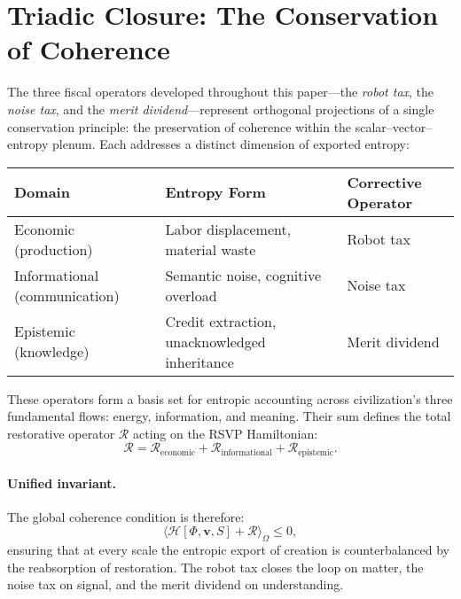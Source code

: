 \documentclass[12pt]{article}
\begin{document}
\section{Triadic Closure: The Conservation of Coherence}
\label{sec:triadic-closure}
The three fiscal operators developed throughout this paper—the \emph{robot tax}, the \emph{noise tax}, and the \emph{merit dividend}—represent orthogonal projections of a single conservation principle: the preservation of coherence within the scalar–vector–entropy plenum. Each addresses a distinct dimension of exported entropy:
\begin{center}
\begin{tabular}{@{}lll@{}}
\toprule
\textbf{Domain} & \textbf{Entropy Form} & \textbf{Corrective Operator} \\
\midrule
Economic (production) & Labor displacement, material waste & Robot tax \\
Informational (communication) & Semantic noise, cognitive overload & Noise tax \\
Epistemic (knowledge) & Credit extraction, unacknowledged inheritance & Merit dividend \\
\bottomrule
\end{tabular}
\end{center}

These operators form a basis set for entropic accounting across civilization’s three fundamental flows: energy, information, and meaning. Their sum defines the total restorative operator $\mathcal{R}$ acting on the RSVP Hamiltonian:
\[
\mathcal{R} = \mathcal{R}_\text{economic} + \mathcal{R}_\text{informational} + \mathcal{R}_\text{epistemic}.
\]

\paragraph{Unified invariant.}
The global coherence condition is therefore:
\[
\langle \mathcal{H}[\Phi,\mathbf{v},S] + \mathcal{R} \rangle_{\Omega} \le 0,
\]
ensuring that at every scale the entropic export of creation is counterbalanced by the reabsorption of restoration. The robot tax closes the loop on matter, the noise tax on signal, and the merit dividend on understanding.
\end{document}
